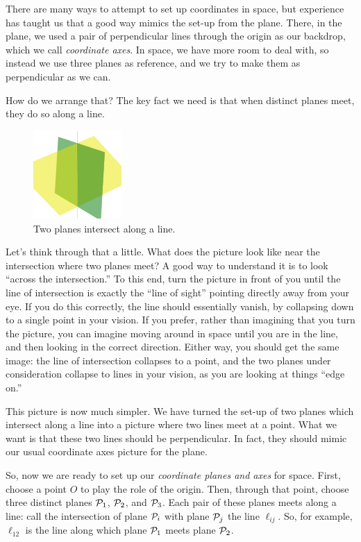 \documentclass[00-livre-main.tex]{subfiles}
\begin{document}
There are many ways to attempt to set up coordinates in space, but experience has taught us that a good way mimics the set-up from the plane. There, in the plane, we used a pair of perpendicular lines through the origin as our backdrop, which we call \emph{coordinate axes}. In space, we have more room to deal with, so instead we use three planes as reference, and we try to make them as perpendicular as we can.

How do we arrange that? The key fact we need is that when distinct planes meet, they do so along a line. 
\begin{figure}[h]
\centering
\includegraphics[width=0.3\textwidth]{images/two-planes-intersect.png}
\caption{Two planes intersect along a line.}
\label{fig:two-planes}
\end{figure}
Let's think through that a little. What does the picture look like near the intersection where two planes meet? A good way to understand it is to look ``across the intersection.'' To this end, turn the picture in front of you until the line of intersection is exactly the ``line of sight'' pointing directly away from your eye. If you do this correctly, the line should essentially vanish, by collapsing down to a single point in your vision. If you prefer, rather than imagining that you turn the picture, you can imagine moving around in space until you are in the line, and then looking in the correct direction. Either way, you should get the same image: the line of intersection collapses to a point, and the two planes under consideration collapse to lines in your vision, as you are looking at things ``edge on.''

This picture is now much simpler. We have turned the set-up of two planes which intersect along a line into a picture where two lines meet at a point. What we want is that these two lines should be perpendicular. In fact, they should mimic our usual coordinate axes picture for the plane.

So, now we are ready to set up our \emph{coordinate planes and axes} for space. First, choose a point $O$ to play the role of the origin. Then, through that point, choose three distinct planes $\mathcal{P}_1$, $\mathcal{P}_2$, and $\mathcal{P}_3$. Each pair of these planes meets along a line: call the intersection of plane $\mathcal{P}_i$ with plane $\mathcal{P}_j$ the line $\ell_{ij}$. So, for example, $\ell_{12}$ is the line along which plane $\mathcal{P}_1$ meets plane $\mathcal{P}_2$.
\end{document}
